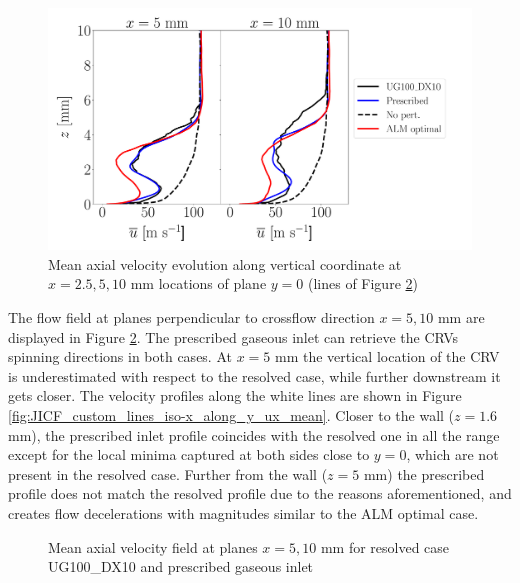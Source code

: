 \begin{figure}[ht]
\centering
   \includegraphics[scale=0.26]{./part2_developments/figures_ch6_lagrangian_JICF/gas_field_initial_conditions/custom_lines_y0_along_z_ux_mean}
\caption{Mean axial velocity evolution along vertical coordinate at $x = 2.5, 5, 10$ mm locations of plane $y = 0$ (lines of Figure \ref{fig:custom_gas_fields_plane_x}) }
\label{fig:JICF_ICS_custom_lines_y0_along_z_ux_mean}
\end{figure}
\clearpage

The flow field at planes perpendicular to crossflow direction $x = 5, 10$ mm  are displayed in Figure \ref{fig:custom_gas_fields_plane_x}. The prescribed gaseous inlet can retrieve the CRVs spinning directions in both cases. At $x = 5$ mm the vertical location of the CRV is underestimated with respect to the resolved case, while further downstream it gets closer. The velocity profiles along the white lines are shown in Figure \ref{fig:JICF_custom_lines_iso-x_along_y_ux_mean}.  Closer to the wall ($z = 1.6$ mm), the prescribed inlet profile coincides with the resolved one in all the range except for the local minima captured at both sides close to $y = 0$, which are not present in the resolved case. Further from the wall ($z = 5$ mm) the prescribed profile does not match the resolved profile due to the reasons aforementioned, and creates flow decelerations with magnitudes similar to the ALM optimal case. 

\begin{figure}[h!]	
	\centering	{}
	\caption{Mean axial velocity field at planes $x = 5, 10$ mm for resolved case UG100\_DX10 and prescribed gaseous inlet}
	\label{fig:custom_gas_fields_plane_x}
\end{figure}

